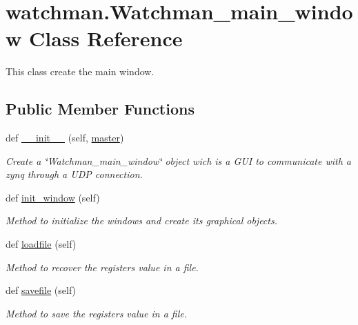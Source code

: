 \hypertarget{classwatchman_1_1_watchman__main__window}{}\section{watchman.\+Watchman\+\_\+main\+\_\+window Class Reference}
\label{classwatchman_1_1_watchman__main__window}


This class create the main window.  


\subsection*{Public Member Functions}
\begin{DoxyCompactItemize}
\item 
def \mbox{\hyperlink{classwatchman_1_1_watchman__main__window_a4f1913d70284dd2b3d17e17a76d64bd8}{\+\_\+\+\_\+init\+\_\+\+\_\+}} (self, \mbox{\hyperlink{classwatchman_1_1_watchman__main__window_a7db5be5bd31dd142b2ccfac4e45e1c02}{master}})
\begin{DoxyCompactList}\small\item\em Create a \char`\"{}\+Watchman\+\_\+main\+\_\+window\char`\"{} object wich is a G\+UI to communicate with a zynq through a U\+DP connection. \end{DoxyCompactList}\item 
def \mbox{\hyperlink{classwatchman_1_1_watchman__main__window_a9b2df908b2feab8ac290197298cc4a7e}{init\+\_\+window}} (self)
\begin{DoxyCompactList}\small\item\em Method to initialize the windows and create its graphical objects. \end{DoxyCompactList}\item 
def \mbox{\hyperlink{classwatchman_1_1_watchman__main__window_aabb93204515ee2a01c81d9a2dd846a89}{loadfile}} (self)
\begin{DoxyCompactList}\small\item\em Method to recover the register\textquotesingle{}s value in a file. \end{DoxyCompactList}\item 
def \mbox{\hyperlink{classwatchman_1_1_watchman__main__window_a5f2f0684e828492369f1e11c50192dc3}{savefile}} (self)
\begin{DoxyCompactList}\small\item\em Method to save the register\textquotesingle{}s value in a file. \end{DoxyCompactList}\item 

\end{DoxyCompactItemize}
